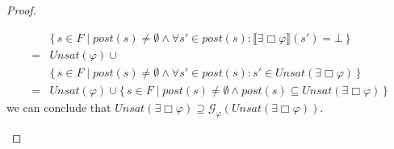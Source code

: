 \documentclass[12pt]{article}
\newcommand{\always}{\Box}
\theoremstyle{definition}
\newcommand{\satisfaction}[1]{\llbracket #1 \rrbracket}
\newcommand{\bottom}{\mathord{\perp}}
\newenvironment{franck}{\color{red}}{\color{black}}
\begin{document}
\begin{proof}
\begin{itemize}
\begin{franck}
\begin{align*}
& \{\, s \in F \mid \mathit{post}(s) \not= \emptyset \wedge \forall s' \in \mathit{post}(s) : \satisfaction{\exists \always \varphi}(s') = \bottom  \,\}\\
= & \mathit{Unsat}(\varphi) \cup\\
& \{\, s \in F \mid \mathit{post}(s) \not= \emptyset \wedge \forall s' \in \mathit{post}(s) : s' \in \mathit{Unsat}(\exists \always \varphi) \,\}\\
= & \mathit{Unsat}(\varphi) \cup \{\, s \in F \mid \mathit{post}(s) \not= \emptyset \wedge \mathit{post}(s) \subseteq \mathit{Unsat}(\exists \always \varphi) \,\}
\end{align*}
we can conclude that $\mathit{Unsat}(\exists \always \varphi) \supseteq \mathcal{G}_{\varphi}(\mathit{Unsat}(\exists \always \varphi))$.


\end{franck}
\end{itemize}
\end{proof}
\end{document}

